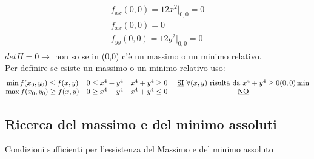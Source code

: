 \begin{esempio}
\begin{enumerate}
\begin{equation*}
\begin{matrix}
\begin{matrix}
					f_{xx}(0,0)=12x^2|_{0,0}=0\\
					f_{xx}(0,0)= 0\\
					f_{yy}(0,0)=12y^2|_{0,0}=0
				  \end{matrix}
			  \end{matrix}
		  \end{equation*}
		  $det H=0 \to$ non so se in (0,0) c'è un massimo o un minimo
		  relativo.\\
		  Per definire se esiste un massimo o un minimo relativo uso:
		  \begin{equation*}
			  \begin{matrix}
				  \min f(x_0,y_0)\leq f(x,y) & 0\leq x^4+y^4 & x^4+y^4\geq 0 &
				  \text{ \underline{SI} $\forall(x,y)$ risulta da
				  $x^4+y^4\geq 0 (0,0)\min$}\\
				  \max f(x_0,y_0)\geq f(x,y) & 0\geq x^4+y^4 & x^4+y^4\leq 0 &
				  \text{ \underline{NO}}
			  \end{matrix}
		  \end{equation*}
  \end{enumerate}
\end{esempio}
\subsection{Ricerca del massimo e del minimo assoluti}
Condizioni sufficienti per l'essistenza del Massimo e del minimo assoluto
